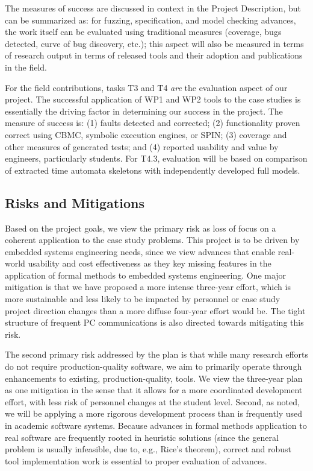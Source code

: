 \documentclass[12pt]{article}
\begin{document}
The measures of success are discussed in context in the Project Description, but can be summarized as:  for fuzzing, specification, and model checking advances, the work itself can be evaluated using traditional measures (coverage, bugs detected, curve of bug discovery, etc.); this aspect will also be measured in terms of research output in terms of released tools and their adoption and publications in the field.

For the field contributions,  tasks T3 and T4 \emph{are} the evaluation
aspect of our project. The successful application of WP1 and WP2 tools to the case
studies is essentially the driving factor in determining our success
in the project.  The measure of success is: (1) faults detected and corrected; (2)
functionality proven correct using CBMC, symbolic execution engines,
or SPIN; (3) coverage and other measures of generated tests; and (4)
reported usability and value by engineers,
particularly students.  For T4.3, evaluation will be based on
comparison of extracted time automata skeletons with independently developed full 
models.

\subsection{Risks and Mitigations}

Based on the project goals, we view the primary risk as loss of focus on a coherent application to the case study problems.  This project is to be driven by embedded systems engineering needs, since we view advances that enable real-world usability and cost effectiveness as they key missing features in the application of formal methods to embedded systems engineering.  One major mitigation is that we have proposed a more intense three-year effort, which is more sustainable and less likely to be impacted by personnel or case study project direction changes than a more diffuse four-year effort would be.  The tight structure of frequent PC communications is also directed towards mitigating this risk.

The second primary risk addressed by the plan is that while many research efforts do not require production-quality software, we aim to primarily operate through enhancements to existing, production-quality, tools.  We view the three-year plan as one mitigation in the sense that it allows for a more coordinated development effort, with less risk of personnel changes at the student level.  Second, as noted, we will be applying a more rigorous development process than is frequently used in academic software systems.  Because advances in formal methods application to real software are frequently rooted in heuristic solutions (since the general problem is usually infeasible, due to, e.g., Rice's theorem), correct and robust tool implementation work is essential to proper evaluation of advances.
\end{document}
